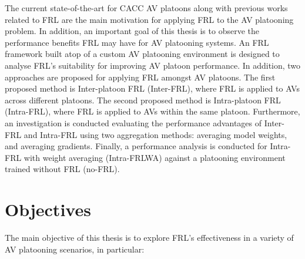 The current state-of-the-art for CACC AV platoons along with previous
works related to FRL are the main motivation for applying FRL to the AV platooning problem. In addition,
an important goal of this thesis is to observe the performance
benefits FRL may have for AV platooning systems.  An FRL framework built atop of a custom AV
platooning environment is designed to analyse FRL's suitability for improving AV platoon performance.
In addition, two approaches are proposed for applying FRL amongst AV platoons. The first proposed
method is Inter-platoon FRL (Inter-FRL), where FRL is applied to AVs across different platoons.
The second proposed method is Intra-platoon FRL (Intra-FRL), where FRL is applied to AVs
within the same platoon.  Furthermore, an investigation is conducted evaluating the performance advantages of
Inter-FRL and Intra-FRL using two aggregation methods: averaging model weights,
and averaging gradients.  Finally, a performance analysis is conducted for
Intra-FRL with weight averaging (Intra-FRLWA) against a platooning environment trained
without FRL (no-FRL).

\section{Objectives}
The main objective of this thesis is to explore FRL's effectiveness in a variety of AV
platooning scenarios, in particular:

